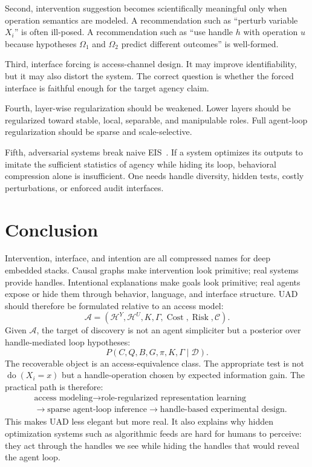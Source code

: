 \documentclass[11pt]{article}
\newcommand{\Hh}{\mathcal H}
\newcommand{\A}{\mathcal A}
\newcommand{\D}{\mathcal D}
\newcommand{\doop}{\operatorname{do}}
\newcommand{\cost}{\operatorname{Cost}}
\newcommand{\risk}{\operatorname{Risk}}
\begin{document}
Second, intervention suggestion becomes scientifically meaningful only when
operation semantics are modeled. A recommendation such as ``perturb variable
$X_i$'' is often ill-posed. A recommendation such as ``use handle $h$ with
operation $u$ because hypotheses $\Omega_1$ and $\Omega_2$ predict different
outcomes'' is well-formed.

Third, interface forcing is access-channel design. It may improve identifiability,
but it may also distort the system. The correct question is whether the forced
interface is faithful enough for the target agency claim.

Fourth, layer-wise regularization should be weakened. Lower layers should be
regularized toward stable, local, separable, and manipulable roles. Full agent-loop
regularization should be sparse and scale-selective.

Fifth, adversarial systems break naive EIS~\cite{eis2025,dennett1987intentional}. If a system optimizes its outputs to
imitate the sufficient statistics of agency while hiding its loop, behavioral
compression alone is insufficient. One needs handle diversity, hidden tests,
costly perturbations, or enforced audit interfaces.

\section{Conclusion}

Intervention, interface, and intention are all compressed names for deep embedded
stacks. Causal graphs make intervention look primitive; real systems provide
handles. Intentional explanations make goals look primitive; real agents expose
or hide them through behavior, language, and interface structure. UAD~\cite{uad2025} should
therefore be formulated relative to an access model:
\[
    \A=(\Hh^Y,\Hh^U,K,\Gamma,\cost,\risk,\mathcal C).
\]
Given $\A$, the target of discovery is not an agent simpliciter but a posterior
over handle-mediated loop hypotheses:
\[
    P(C,Q,B,G,\pi,K,\Gamma\mid \D).
\]
The recoverable object is an access-equivalence class. The appropriate test is
not $\doop(X_i=x)$ but a handle-operation chosen by expected information gain.
The practical path is therefore:
\begin{align*}
    &\text{access modeling}
    \to \text{role-regularized representation learning} \\
    &\to \text{sparse agent-loop inference}
    \to \text{handle-based experimental design}.
\end{align*}
This makes UAD less elegant but more real. It also explains why hidden optimization
systems such as algorithmic feeds are hard for humans to perceive: they act through
the handles we see while hiding the handles that would reveal the agent loop.



\end{document}
